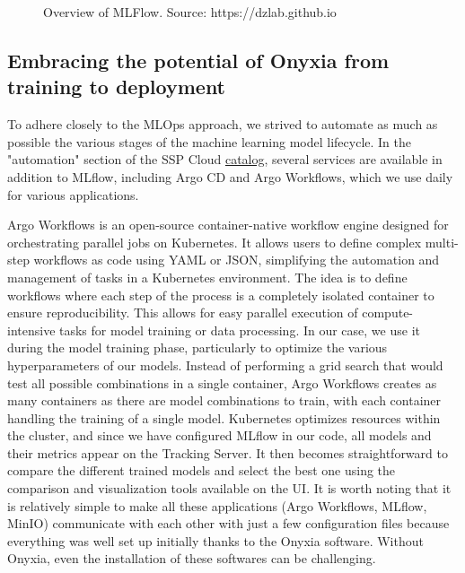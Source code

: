 \begin{figure}[htbp]
    \centering
    \caption{Overview of MLFlow. Source: https://dzlab.github.io}
    \label{fig:mlflow-overview}
\end{figure}

\subsection{Embracing the potential of Onyxia from training to deployment}

To adhere closely to the MLOps approach, we strived to automate as much as possible the various stages of the machine learning model lifecycle. In the "automation" section of the SSP Cloud \href{https://datalab.sspcloud.fr/catalog/automation}{catalog}, several services are available in addition to MLflow, including Argo CD and Argo Workflows, which we use daily for various applications.

Argo Workflows is an open-source container-native workflow engine designed for orchestrating parallel jobs on Kubernetes. It allows users to define complex multi-step workflows as code using YAML or JSON, simplifying the automation and management of tasks in a Kubernetes environment. The idea is to define workflows where each step of the process is a completely isolated container to ensure reproducibility. This allows for easy parallel execution of compute-intensive tasks for model training or data processing. In our case, we use it during the model training phase, particularly to optimize the various hyperparameters of our models. Instead of performing a grid search that would test all possible combinations in a single container, Argo Workflows creates as many containers as there are model combinations to train, with each container handling the training of a single model. Kubernetes optimizes resources within the cluster, and since we have configured MLflow in our code, all models and their metrics appear on the Tracking Server. It then becomes straightforward to compare the different trained models and select the best one using the comparison and visualization tools available on the UI. It is worth noting that it is relatively simple to make all these applications (Argo Workflows, MLflow, MinIO) communicate with each other with just a few configuration files because everything was well set up initially thanks to the Onyxia software. Without Onyxia, even the installation of these softwares can be challenging.

